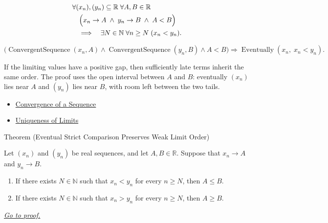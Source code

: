 \begin{remark*}
\[
\begin{aligned}
&\forall (x_n),(y_n)\subseteq\mathbb{R}\;\forall A,B\in\mathbb{R}\\
&\quad\Bigl(
  x_n\to A
  \;\land\;
  y_n\to B
  \;\land\;
  A<B
\Bigr)\\
&\quad\Longrightarrow\quad
\exists N\in\mathbb{N}\;\forall n\ge N\;(x_n<y_n).
\end{aligned}
\]
\end{remark*}

\begin{remark*}
\[
\bigl(
\operatorname{ConvergentSequence}(x_n,A)
\land
\operatorname{ConvergentSequence}(y_n,B)
\land
A<B
\bigr)
\Longrightarrow
\operatorname{Eventually}(x_n,\;x_n<y_n).
\]
\end{remark*}

\begin{remark*}[Interpretation]
If the limiting values have a positive gap, then sufficiently late terms
inherit the same order. The proof uses the open interval between $A$ and $B$:
eventually $(x_n)$ lies near $A$ and $(y_n)$ lies near $B$, with room left
between the two tails.
\end{remark*}

\begin{dependencies}
\begin{itemize}
  \item \hyperref[def:convergent-sequence]{Convergence of a Sequence}
  \item \hyperref[thm:uniqueness-of-limits]{Uniqueness of Limits}
\end{itemize}
\end{dependencies}


\begin{theorembox}{Theorem (Eventual Strict Comparison Preserves Weak Limit Order)}
\begin{theorem}
\label{thm:eventual-strict-comparison-preserves-weak-limit-order}

Let $(x_n)$ and $(y_n)$ be real sequences, and let $A,B\in\mathbb{R}$.
Suppose that $x_n\to A$ and $y_n\to B$.
\begin{enumerate}[label=(\alph*)]
  \item If there exists $N\in\mathbb{N}$ such that $x_n<y_n$ for every
  $n\ge N$, then $A\le B$.
  \item If there exists $N\in\mathbb{N}$ such that $x_n>y_n$ for every
  $n\ge N$, then $A\ge B$.
\end{enumerate}

\smallskip
\noindent
\hyperref[prf:eventual-strict-comparison-preserves-weak-limit-order]{\textit{Go to proof.}}
\end{theorem}
\end{theorembox}

